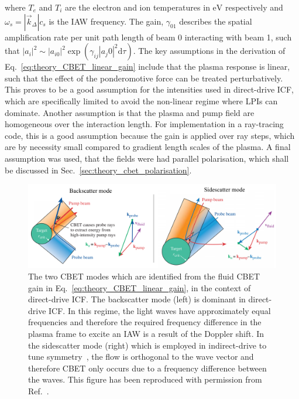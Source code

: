 where $T_e$ and $T_i$ are the electron and ion temperatures in $\text{eV}$ respectively and $\omega_s = |\vec{k}_\Delta|c_s$ is the \ac{IAW} frequency.
The gain, $\gamma_{01}$ describes the spatial amplification rate per unit path length of beam 0 interacting with beam 1, such that $|a_i|^2\sim |a_{i0}|^2\exp{(\gamma_{ij}|a_j0|^2 \text{d}\tau)}$.
The key assumptions in the derivation of Eq.~\ref{eq:theory_CBET_linear_gain} include that the plasma response is linear, such that the effect of the ponderomotive force can be treated perturbatively.
This proves to be a good assumption for the intensities used in direct-drive \ac{ICF}, which are specifically limited to avoid the non-linear regime where \ac{LPIs} can dominate.
Another assumption is that the plasma and pump field are homogeneous over the interaction length.
For implementation in a ray-tracing code, this is a good assumption because the gain is applied over ray steps, which are by necessity small compared to gradient length scales of the plasma.
A final assumption was used, that the fields were had parallel polarisation, which shall be discussed in Sec.~\ref{sec:theory_cbet_polarisation}. 

\begin{figure}[t!]
    \includegraphics[width=\linewidth]{Theory/Images/CBET_modes.png}
    \centering
    \caption{The two \ac{CBET} modes which are identified from the fluid \ac{CBET} gain in Eq.~\ref{eq:theory_CBET_linear_gain}, in the context of direct-drive \ac{ICF}.
    The backscatter mode (left) is dominant in direct-drive \ac{ICF}.
    In this regime, the light waves have approximately equal frequencies and therefore the required frequency difference in the plasma frame to excite an \ac{IAW} is a result of the Doppler shift.
    In the sidescatter mode (right) which is employed in indirect-drive to tune symmetry~\cite{michel_tuning_2009}, the flow is orthogonal to the wave vector and therefore \ac{CBET} only occurs due to a frequency difference between the waves.
    This figure has been reproduced with permission from Ref.~\cite{marozas_wavelengthdetuning_2018}.
    }%
    \label{fig:theory_CBET_modes}
\end{figure}

